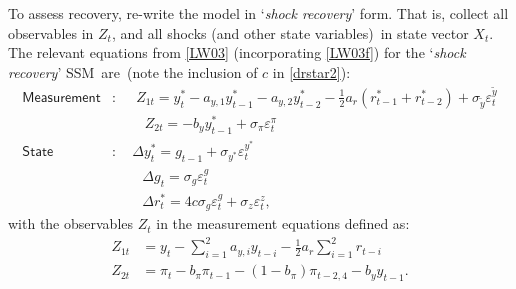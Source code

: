 \documentclass[a4paper,12pt]{article}
\newcommand{\bsq}{\begin{subequations}}\newcommand{\esq}{\end{subequations}}
\newcommand{\vsp}[1]{\vspace*{#1mm}}\newcommand{\hsp}[1]{\hspace*{#1mm}}  }
\begin{document}
To assess recovery, re-write the model in `\emph{shock recovery}' form. That
is, collect all observables in $Z_{t}$, and all shocks (and other state
variables)\ in state vector $X_{t}$. The relevant equations from \ref{LW03}
(incorporating \ref{LW03f}) for the `\emph{shock recovery}' SSM\ are\ (note
the inclusion of $c$ in \ref{drstar2}):\bsq\label{ssm0}%
\begin{align}
\mathsf{Measurement}& :\;\quad Z_{1t}=y_{t}^{\ast }-a_{y,1}y_{t-1}^{\ast
}-a_{y,2}y_{t-2}^{\ast }-\tfrac{1}{2}a_{r}\left( r_{t-1}^{\ast
}+r_{t-2}^{\ast }\right) +\sigma _{\tilde{y}}\varepsilon _{t}^{\tilde{y}} \\
\phantom{\mathsf{Measurement}}& \,\,\;\;\phantom{:\quad}%
Z_{2t}=-b_{y}y_{t-1}^{\ast }+\sigma _{\pi }\varepsilon _{t}^{\pi } \\
\mathsf{State}& :\quad \Delta y_{t}^{\ast }=g_{t-1}+\sigma _{y^{\ast
}}\varepsilon _{t}^{y^{\ast }} \\
\phantom{\mathsf{State}}& \;\,\;\phantom{:\quad}\Delta g_{t}=\sigma
_{g}\varepsilon _{t}^{g} \\
\phantom{\mathsf{State}}& \;\,\;\phantom{:\quad}\Delta r_{t}^{\ast
}=4c\sigma _{g}\varepsilon _{t}^{g}+\sigma _{z}\varepsilon _{t}^{z},
\label{drstar2}
\end{align}%
\esq with the observables $Z_{t}$ in the measurement equations defined as:%
\vsp{-3}
\begin{align*}
Z_{1t}& =y_{t}-\sum_{i=1}^{2}a_{y,i}y_{t-i}-\tfrac{1}{2}a_{r}%
\sum_{i=1}^{2}r_{t-i} \\
Z_{2t}& =\pi _{t}-b_{\pi }\pi _{t-1}-(1-b_{\pi })\pi _{t-2,4}-b_{y}y_{t-1}.
\end{align*}
\end{document}

